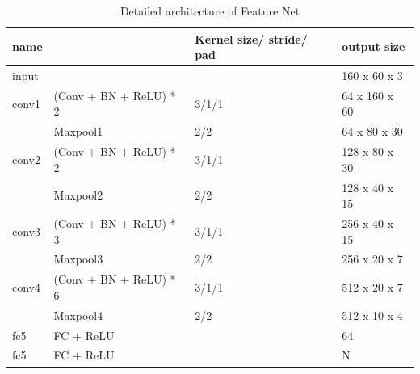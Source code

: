 \documentclass{article}[12pt,a4paper]
\begin{document}
\begin{table}[h]
\begin{center}
\begin{tabular}{|l|l|l|l|}
\hline
name & & Kernel size/ stride/ pad & output size \\
\hline
input & & & 160 x 60 x 3 \\
\hline
conv1 & (Conv + BN + ReLU) * 2 & 3/1/1 & 64 x 160 x 60 \\
\hline
& Maxpool1 & 2/2 & 64 x 80 x 30 \\
\hline
conv2 & (Conv + BN + ReLU) * 2 & 3/1/1 & 128 x 80 x 30 \\
\hline
& Maxpool2 & 2/2 & 128 x 40 x 15 \\
\hline
conv3 & (Conv + BN + ReLU) * 3 & 3/1/1 & 256 x 40 x 15 \\
\hline
& Maxpool3 & 2/2 & 256 x 20 x 7  \\
\hline
conv4 & (Conv + BN + ReLU) * 6 & 3/1/1 & 512 x 20 x 7\\
\hline
& Maxpool4 & 2/2 & 512 x 10 x 4 \\
\hline
fc5 & FC + ReLU & & 64 \\
\hline
fc5 & FC + ReLU & & N \\
\hline
\end{tabular}
\caption{Detailed architecture of Feature Net}
\end{center}
\end{table}
\end{document}
